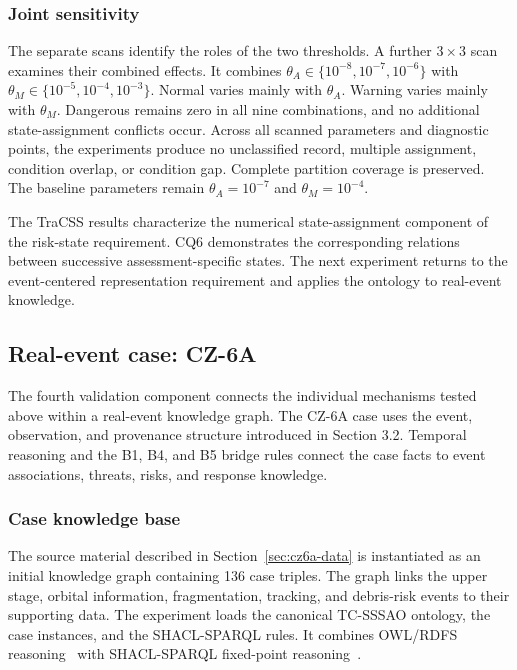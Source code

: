 \documentclass[Royal,sageh,times]{sagej}
\begin{document}
\subsubsection{Joint sensitivity}

The separate scans identify the roles of the two thresholds. A further $3\times3$ scan examines their combined effects. It combines $\theta_A\in\{10^{-8},10^{-7},10^{-6}\}$ with $\theta_M\in\{10^{-5},10^{-4},10^{-3}\}$. Normal varies mainly with $\theta_A$. Warning varies mainly with $\theta_M$. Dangerous remains zero in all nine combinations, and no additional state-assignment conflicts occur. Across all scanned parameters and diagnostic points, the experiments produce no unclassified record, multiple assignment, condition overlap, or condition gap. Complete partition coverage is preserved. The baseline parameters remain $\theta_A=10^{-7}$ and $\theta_M=10^{-4}$.

The TraCSS results characterize the numerical state-assignment component of the risk-state requirement. CQ6 demonstrates the corresponding relations between successive assessment-specific states. The next experiment returns to the event-centered representation requirement and applies the ontology to real-event knowledge.

\subsection{Real-event case: CZ-6A}
\label{sec:cz6a-case}

The fourth validation component connects the individual mechanisms tested above within a real-event knowledge graph. The CZ-6A case uses the event, observation, and provenance structure introduced in Section 3.2. Temporal reasoning and the B1, B4, and B5 bridge rules connect the case facts to event associations, threats, risks, and response knowledge.

\subsubsection{Case knowledge base}

The source material described in Section~\ref{sec:cz6a-data} is instantiated as an initial knowledge graph containing 136 case triples. The graph links the upper stage, orbital information, fragmentation, tracking, and debris-risk events to their supporting data. The experiment loads the canonical TC-SSSAO ontology, the case instances, and the SHACL-SPARQL rules. It combines OWL/RDFS reasoning~\citep{owl2,rdfs2014} with SHACL-SPARQL fixed-point reasoning~\citep{shacl2017,shaclaf2017}.
\end{document}
